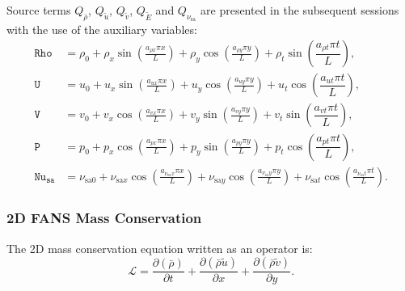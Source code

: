 \documentclass[10pt]{article}
\newcommand{\Diff}[2] {\dfrac{\partial( #1)}{\partial #2}}
\newcommand{\diff}[2] {\dfrac{\partial #1}{\partial #2}}
\newcommand{\bv}[1]{\ensuremath{\mbox{\boldmath$ #1 $}}}
\newcommand{\Rho}{\,\mathtt{Rho}}
\newcommand{\PP}{\,\mathtt{P}}
\newcommand{\U}{\,\mathtt{U}}
\newcommand{\V}{\,\mathtt{V}}
\newcommand{\Nu}{\,\mathtt{Nu_{sa}}}
\newcommand{\Lo}{\,\mathcal{L}}
\newcommand{\sa}{\nu_{\mathrm{sa}}}
\newcommand{\tsa}{\mathrm{sa}}
\newcommand{\brho}{\bar{\rho}}
\newcommand{\tu}{\tilde{u}}
\newcommand{\tv}{\tilde{v}}
\newcommand{\tS}{\tilde{S}}
\newcommand{\tE}{\tilde{E}}
\begin{document}



Source terms $Q_{\brho}$, $Q_{\tu}$, $Q_{\tv}$, $Q_{\tE}$ and $Q_{\sa}$ are presented in the subsequent sessions with the use of the auxiliary variables:
\begin{equation}
 \begin{split}
\label{eq:aux_2d}
\Rho &= \rho_{0}+ \rho_{x} \sin\left(\frac{a_{ \rho x} \pi x}{L}\right)+ \rho_{y} \cos\left(\frac{a_{ \rho y} \pi y}{L}\right)+ \rho_t \sin\left(\dfrac{a_{\rho t} \pi t}{L}\right),\\
\U &= u_{0}+u_{x} \sin\left(\frac{a_{u x} \pi x}{L}\right)+u_{y} \cos\left(\frac{a_{u y} \pi y}{L}\right) + u_t \cos\left(\dfrac{a_{u t} \pi t}{L}\right),\\
\V &= v_{0}+v_{x} \cos\left(\frac{a_{v x} \pi x}{L}\right)+v_{y} \sin\left(\frac{a_{v y} \pi y}{L}\right)+ v_t \sin\left(\dfrac{a_{v t} \pi t}{L}\right),\\
\PP &= p_{0}+p_{x} \cos\left(\frac{a_{p x} \pi x}{L}\right)+p_{y} \sin\left(\frac{a_{p y} \pi y}{L}\right)+ p_t \cos\left(\dfrac{a_{p t} \pi t}{L}\right),\\
\Nu &= \nu_{\tsa 0} +\nu_{\tsa x} \cos\left(\frac{a_{\sa x} \pi x}{L}\right) + \nu_{\tsa y} \cos\left(\frac{a_{\sa y} \pi y}{L}\right) + \nu_{\tsa t}\cos\left(\frac{a_{\sa t} \pi t}{L}\right).
\end{split}
\end{equation}


\subsubsection{2D FANS Mass Conservation}

The 2D mass conservation equation written as an operator is:
\begin{equation*}
  \Lo=\Diff{\brho }{t} +  \Diff{\brho \tu}{x}+\Diff{\brho \tv}{y}.
\end{equation*}
\end{document}
